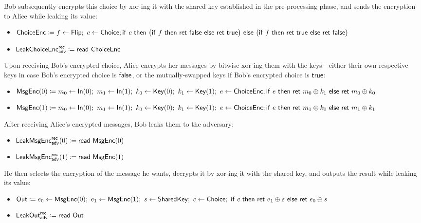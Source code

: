 Bob subsequently encrypts this choice by xor-ing it with the shared key established in the pre-processing phase, and sends the encryption to Alice while leaking its value:
\begin{itemize}
\item $\mathsf{ChoiceEnc} \coloneqq f \leftarrow \mathsf{Flip}; \ c \leftarrow \mathsf{Choice}; \\ \mathsf{if} \ c \ \mathsf{then} \ \big(\mathsf{if} \ f \ \mathsf{then} \ \mathsf{ret} \ \mathsf{false} \ \mathsf{else} \ \mathsf{ret} \ \mathsf{true}\big) \ \mathsf{else} \ \big(\mathsf{if} \ f \ \mathsf{then} \ \mathsf{ret} \ \mathsf{true} \ \mathsf{else} \ \mathsf{ret} \ \mathsf{false}\big)$
\item {\color{blue} $\mathsf{LeakChoiceEnc}^{\mathsf{rec}}_{\mathsf{adv}} \coloneqq \mathsf{read} \ \mathsf{ChoiceEnc}$}
\end{itemize}
Upon receiving Bob's encrypted choice, Alice encrypts her messages by bitwise xor-ing them with the keys - either their own respective keys in case Bob's encrypted choice is $\mathsf{false}$, or the mutually-swapped keys if Bob's encrypted choice is $\mathsf{true}$:
\begin{itemize}
\item $\mathsf{MsgEnc}(0) \coloneqq m_0 \leftarrow \mathsf{In}(0); \ m_1 \leftarrow \mathsf{In}(1); \ k_0 \leftarrow \mathsf{Key}(0); \ k_1 \leftarrow \mathsf{Key}(1); \ e \leftarrow \mathsf{ChoiceEnc}; \\ \mathsf{if} \ e \ \mathsf{then} \ \mathsf{ret} \ m_0 \oplus k_1 \ \mathsf{else} \ \mathsf{ret} \ m_0 \oplus k_0$
\item $\mathsf{MsgEnc}(1) \coloneqq m_0 \leftarrow \mathsf{In}(0); \ m_1 \leftarrow \mathsf{In}(1); \ k_0 \leftarrow \mathsf{Key}(0); \ k_1 \leftarrow \mathsf{Key}(1); \ e \leftarrow \mathsf{ChoiceEnc}; \\ \mathsf{if} \ e \ \mathsf{then} \ \mathsf{ret} \ m_1 \oplus k_0 \ \mathsf{else} \ \mathsf{ret} \ m_1 \oplus k_1$
\end{itemize}
After receiving Alice's encrypted messages, Bob leaks them to the adversary:
\begin{itemize}
\item {\color{blue} $\mathsf{LeakMsgEnc}^{\mathsf{rec}}_{\mathsf{adv}}(0) \coloneqq \mathsf{read} \ \mathsf{MsgEnc}(0)$}
\item {\color{blue} $\mathsf{LeakMsgEnc}^{\mathsf{rec}}_{\mathsf{adv}}(1) \coloneqq \mathsf{read} \ \mathsf{MsgEnc}(1)$}
\end{itemize}
He then selects the encryption of the message he wants, decrypts it by xor-ing it with the shared key, and outputs the result while leaking its value:
\begin{itemize}
\item $\mathsf{Out} \coloneqq e_0 \leftarrow \mathsf{MsgEnc}(0); \ e_1 \leftarrow \mathsf{MsgEnc}(1); \ s \leftarrow \mathsf{SharedKey}; \ c \leftarrow \mathsf{Choice}; \ \mathsf{if} \ c \ \mathsf{then} \ \mathsf{ret} \ e_1 \oplus s \ \mathsf{else} \ \mathsf{ret} \ e_0 \oplus s$
\item {\color{blue} $\mathsf{LeakOut}^{\mathsf{rec}}_{\mathsf{adv}} \coloneqq \mathsf{read} \ \mathsf{Out}$}
\end{itemize}
